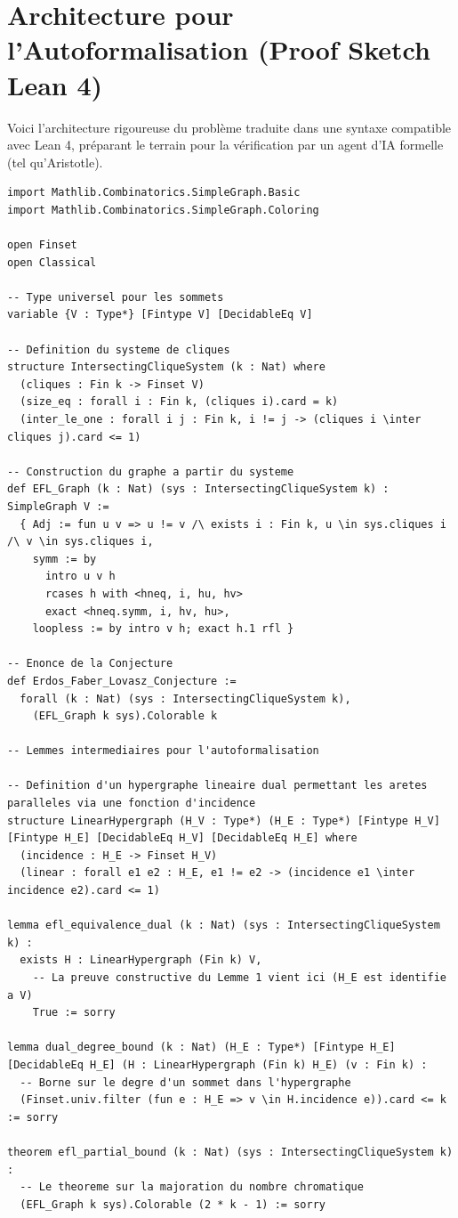 \documentclass[12pt,a4paper]{article}
\begin{document}
\section{Architecture pour l'Autoformalisation (Proof Sketch Lean 4)}

Voici l'architecture rigoureuse du problème traduite dans une syntaxe compatible avec Lean 4, préparant le terrain pour la vérification par un agent d'IA formelle (tel qu'Aristotle).

{\footnotesize
\begin{verbatim}
import Mathlib.Combinatorics.SimpleGraph.Basic
import Mathlib.Combinatorics.SimpleGraph.Coloring

open Finset
open Classical

-- Type universel pour les sommets
variable {V : Type*} [Fintype V] [DecidableEq V]

-- Definition du systeme de cliques
structure IntersectingCliqueSystem (k : Nat) where
  (cliques : Fin k -> Finset V)
  (size_eq : forall i : Fin k, (cliques i).card = k)
  (inter_le_one : forall i j : Fin k, i != j -> (cliques i \inter cliques j).card <= 1)

-- Construction du graphe a partir du systeme
def EFL_Graph (k : Nat) (sys : IntersectingCliqueSystem k) : SimpleGraph V :=
  { Adj := fun u v => u != v /\ exists i : Fin k, u \in sys.cliques i /\ v \in sys.cliques i,
    symm := by
      intro u v h
      rcases h with <hneq, i, hu, hv>
      exact <hneq.symm, i, hv, hu>,
    loopless := by intro v h; exact h.1 rfl }

-- Enonce de la Conjecture
def Erdos_Faber_Lovasz_Conjecture :=
  forall (k : Nat) (sys : IntersectingCliqueSystem k),
    (EFL_Graph k sys).Colorable k

-- Lemmes intermediaires pour l'autoformalisation

-- Definition d'un hypergraphe lineaire dual permettant les aretes paralleles via une fonction d'incidence
structure LinearHypergraph (H_V : Type*) (H_E : Type*) [Fintype H_V] [Fintype H_E] [DecidableEq H_V] [DecidableEq H_E] where
  (incidence : H_E -> Finset H_V)
  (linear : forall e1 e2 : H_E, e1 != e2 -> (incidence e1 \inter incidence e2).card <= 1)

lemma efl_equivalence_dual (k : Nat) (sys : IntersectingCliqueSystem k) :
  exists H : LinearHypergraph (Fin k) V,
    -- La preuve constructive du Lemme 1 vient ici (H_E est identifie a V)
    True := sorry

lemma dual_degree_bound (k : Nat) (H_E : Type*) [Fintype H_E] [DecidableEq H_E] (H : LinearHypergraph (Fin k) H_E) (v : Fin k) :
  -- Borne sur le degre d'un sommet dans l'hypergraphe
  (Finset.univ.filter (fun e : H_E => v \in H.incidence e)).card <= k := sorry

theorem efl_partial_bound (k : Nat) (sys : IntersectingCliqueSystem k) :
  -- Le theoreme sur la majoration du nombre chromatique
  (EFL_Graph k sys).Colorable (2 * k - 1) := sorry
\end{verbatim}
}
\end{document}
